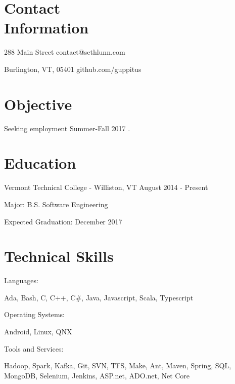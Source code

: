 \documentclass[a4paper,margin,line]{resume}
\newcommand{\rdate}[1]{\hfill {\small #1}}
\begin{document}
\begin{resume}
\section{\mysidestyle Contact \\ Information}
	\begin{asparablank}
		\item 288 Main Street \hfill contact@sethlunn.com
		\item Burlington, VT, 05401 \hfill github.com/guppitus
	\end{asparablank}

\section{\mysidestyle Objective}
	\begin{asparablank}
    	\item Seeking employment Summer-Fall 2017 .
	\end{asparablank}
 
\section{\mysidestyle Education}
   \begin{compactdesc}
		   \item[Vermont Technical College] - Williston, VT \rdate{August 2014 - Present}
		   \begin{asparablank} { \small
				   \item Major: B.S. Software Engineering
		   } \end{asparablank}
		   \begin{asparablank} { \small
				   \item Expected Graduation: December 2017
		   } \end{asparablank}
   \end{compactdesc}

\section{\mysidestyle Technical Skills}
	\begin{compactdesc}
		\item[Languages: ] \begin{asparablank} { \small
			\item Ada, Bash, C, C++, C\#, Java, Javascript, Scala, Typescript
		} \end{asparablank}
		\item[Operating Systems: ] \begin{asparablank} { \small
            \item Android, Linux, QNX
		} \end{asparablank}
		\item[Tools and Services: ] \begin{asparablank} { \small
            \item Hadoop, Spark, Kafka, Git, SVN, TFS, Make, Ant, Maven, Spring, SQL, MongoDB, Selenium, Jenkins, ASP.net, ADO.net, Net Core
		} \end{asparablank}
	\end{compactdesc}


\end{resume}
\end{document}
